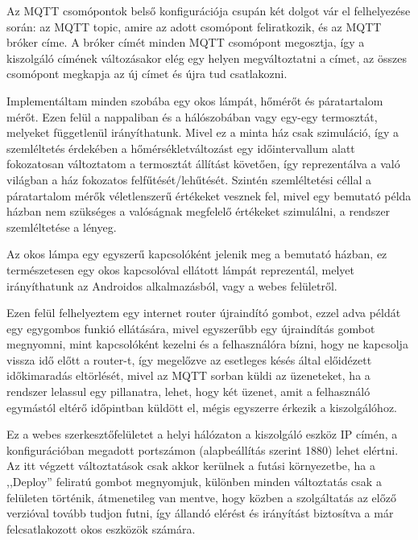 \documentclass[
]{thesis-ekf}
\theoremstyle{definition}
\theoremstyle{remark}
\begin{document}
Az MQTT csomópontok belső konfigurációja csupán két dolgot vár el felhelyezése során: az MQTT topic, amire az adott csomópont feliratkozik, és az MQTT bróker címe. A bróker címét minden MQTT csomópont megosztja, így a kiszolgáló címének változásakor
elég egy helyen megváltoztatni a címet, az összes csomópont megkapja az új címet és újra tud csatlakozni.

Implementáltam minden szobába egy okos lámpát, hőmérőt és páratartalom mérőt. Ezen felül a nappaliban és a hálószobában vagy egy-egy termosztát, melyeket függetlenül irányíthatunk. Mivel ez a minta ház csak szimuláció, így a szemléltetés érdekében
a hőmérsékletváltozást egy időintervallum alatt fokozatosan változtatom a termosztát állítást követően, így reprezentálva a való világban a ház fokozatos felfűtését/lehűtését. Szintén szemléltetési céllal a páratartalom mérők
véletlenszerű értékeket vesznek fel, mivel egy bemutató példa házban nem szükséges a valóságnak megfelelő értékeket szimulálni, a rendszer szemléltetése a lényeg.

Az okos lámpa egy egyszerű kapcsolóként jelenik meg a bemutató házban, ez természetesen egy okos kapcsolóval ellátott lámpát reprezentál, melyet irányíthatunk az Androidos alkalmazásból, vagy a webes felületről.

Ezen felül felhelyeztem egy internet router újraindító gombot, ezzel adva példát egy egygombos funkió ellátására, mivel egyszerűbb egy újraindítás gombot megnyomni, 
mint kapcsolóként kezelni és a felhasználóra bízni, hogy ne kapcsolja vissza idő előtt a router-t, így megelőzve az esetleges 
késés által előidézett időkimaradás eltörlését, mivel az MQTT sorban küldi az üzeneteket, ha a rendszer lelassul egy pillanatra, 
lehet, hogy két üzenet, amit a felhasználó egymástól eltérő időpintban küldött el, mégis egyszerre érkezik a kiszolgálóhoz.

Ez a webes szerkesztőfelületet a helyi hálózaton a kiszolgáló eszköz IP címén, a konfigurációban megadott portszámon (alapbeállítás szerint 1880) lehet elértni.
Az itt végzett változtatások csak akkor kerülnek a futási környezetbe, ha a ,,Deploy'' feliratú gombot megnyomjuk, különben minden változtatás
csak a felületen történik, átmenetileg van mentve, hogy közben a szolgáltatás az előző verzióval tovább tudjon futni, így
állandó elérést és irányítást biztosítva a már felcsatlakozott okos eszközök számára.
\end{document}
